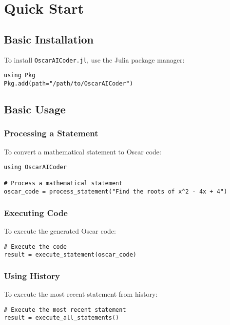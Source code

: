 \documentclass[11pt,a4paper]{article}
\newcommand{\modname}[1]{\texttt{#1}}
\begin{document}
\section{Quick Start}
\label{sec:quickstart}

\subsection{Basic Installation}
\label{sec:installation}

To install \modname{OscarAICoder.jl}, use the Julia package manager:

\begin{lstlisting}
using Pkg
Pkg.add(path="/path/to/OscarAICoder")
\end{lstlisting}

\subsection{Basic Usage}
\label{sec:basicusage}

\subsubsection{Processing a Statement}
To convert a mathematical statement to Oscar code:

\begin{lstlisting}
using OscarAICoder

# Process a mathematical statement
oscar_code = process_statement("Find the roots of x^2 - 4x + 4")
\end{lstlisting}

\subsubsection{Executing Code}
To execute the generated Oscar code:

\begin{lstlisting}
# Execute the code
result = execute_statement(oscar_code)
\end{lstlisting}

\subsubsection{Using History}
To execute the most recent statement from history:

\begin{lstlisting}
# Execute the most recent statement
result = execute_all_statements()
\end{lstlisting}
\end{document}
